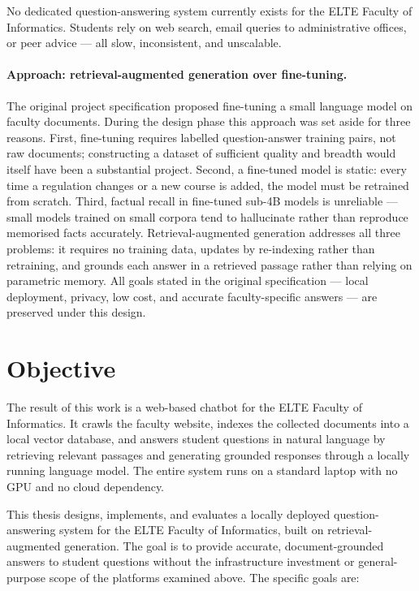 No dedicated question-answering system currently exists for the ELTE Faculty
of Informatics. Students rely on web search, email queries to administrative
offices, or peer advice --- all slow, inconsistent, and unscalable.

\paragraph{Approach: retrieval-augmented generation over fine-tuning.}
The original project specification proposed fine-tuning a small language model
on faculty documents. During the design phase this approach was set aside for
three reasons. First, fine-tuning requires labelled question-answer training
pairs, not raw documents; constructing a dataset of sufficient quality and
breadth would itself have been a substantial project. Second, a fine-tuned
model is static: every time a regulation changes or a new course is added,
the model must be retrained from scratch. Third, factual recall in fine-tuned
sub-4B models is unreliable --- small models trained on small corpora tend to
hallucinate rather than reproduce memorised facts accurately. Retrieval-augmented
generation addresses all three problems: it requires no training data, updates
by re-indexing rather than retraining, and grounds each answer in a retrieved
passage rather than relying on parametric memory. All goals stated in the
original specification --- local deployment, privacy, low cost, and accurate
faculty-specific answers --- are preserved under this design.

\section{Objective}
\label{sec:intro-overview}

The result of this work is a web-based chatbot for the ELTE Faculty of
Informatics. It crawls the faculty website, indexes the collected documents
into a local vector database, and answers student questions in natural
language by retrieving relevant passages and generating grounded responses
through a locally running language model. The entire system runs on a
standard laptop with no GPU and no cloud dependency.

This thesis designs, implements, and evaluates a locally deployed
question-answering system for the ELTE Faculty of Informatics, built on
retrieval-augmented generation. The goal is to provide accurate,
document-grounded answers to student questions without the infrastructure
investment or general-purpose scope of the platforms examined above. The
specific goals are:


